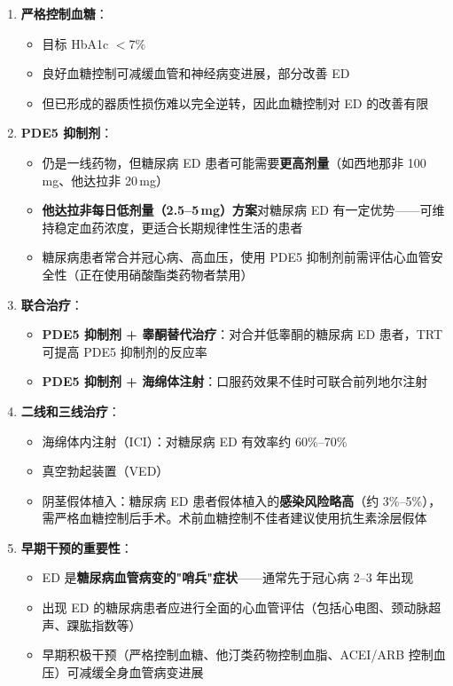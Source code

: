 \documentclass[12pt,a4paper,twoside]{ctexbook}
\begin{document}
\begin{enumerate}
	\item \textbf{严格控制血糖}：
	\begin{itemize}
		\item 目标 HbA1c $<7\%$
		\item 良好血糖控制可减缓血管和神经病变进展，部分改善 ED
		\item 但已形成的器质性损伤难以完全逆转，因此血糖控制对 ED 的改善有限
	\end{itemize}

	\item \textbf{PDE5 抑制剂}：
	\begin{itemize}
		\item 仍是一线药物，但糖尿病 ED 患者可能需要\textbf{更高剂量}（如西地那非 100\,mg、他达拉非 20\,mg）
		\item \textbf{他达拉非每日低剂量（2.5--5\,mg）方案}对糖尿病 ED 有一定优势——可维持稳定血药浓度，更适合长期规律性生活的患者
		\item 糖尿病患者常合并冠心病、高血压，使用 PDE5 抑制剂前需评估心血管安全性（正在使用硝酸酯类药物者禁用）
	\end{itemize}

	\item \textbf{联合治疗}：
	\begin{itemize}
		\item \textbf{PDE5 抑制剂 + 睾酮替代治疗}：对合并低睾酮的糖尿病 ED 患者，TRT 可提高 PDE5 抑制剂的反应率
		\item \textbf{PDE5 抑制剂 + 海绵体注射}：口服药效果不佳时可联合前列地尔注射
	\end{itemize}

	\item \textbf{二线和三线治疗}：
	\begin{itemize}
		\item 海绵体内注射（ICI）：对糖尿病 ED 有效率约 60\%--70\%
		\item 真空勃起装置（VED）
		\item 阴茎假体植入：糖尿病 ED 患者假体植入的\textbf{感染风险略高}（约 3\%--5\%），需严格血糖控制后手术。术前血糖控制不佳者建议使用抗生素涂层假体
	\end{itemize}

	\item \textbf{早期干预的重要性}：
	\begin{itemize}
		\item ED 是\textbf{糖尿病血管病变的"哨兵"症状}——通常先于冠心病 2--3 年出现
		\item 出现 ED 的糖尿病患者应进行全面的心血管评估（包括心电图、颈动脉超声、踝肱指数等）
		\item 早期积极干预（严格控制血糖、他汀类药物控制血脂、ACEI/ARB 控制血压）可减缓全身血管病变进展
	\end{itemize}
\end{enumerate}
\end{document}
